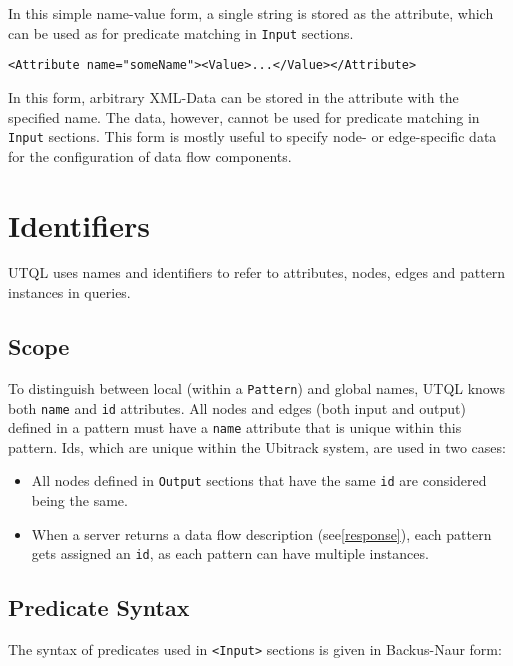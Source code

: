 \documentclass[11pt]{article}
\begin{document}
In this simple name-value form, a single string is stored as the attribute, which can be used as for predicate matching in \texttt{Input} sections.

\begin{Verbatim}[fontsize=\footnotesize,tabsize=2]
<Attribute name="someName"><Value>...</Value></Attribute>
\end{Verbatim}

In this form, arbitrary XML-Data can be stored in the attribute with the specified name. The data, however, cannot be used for predicate matching in \texttt{Input}  sections. This form is mostly useful to specify node- or edge-specific data for the configuration of data flow components.

\section{Identifiers}
\label{identifiers}

UTQL uses names and identifiers to refer to
attributes, nodes, edges and pattern instances in queries.

\subsection{Scope}
\label{scope}

To distinguish between local (within a \texttt{Pattern})
and global names, UTQL knows both \texttt{name} and 
\texttt{id} attributes. All nodes and edges (both input and output) defined in a pattern must have a 
\texttt{name} attribute that is unique within this pattern. Ids, which are unique within
the Ubitrack system, are used in two cases:

\begin{itemize}
 \item All nodes defined in \texttt{Output} sections that have the same \texttt{id} are considered being the same.
 \item When a server returns a data flow description (see\ref{response}), each pattern gets assigned an \texttt{id}, as
     each pattern can have multiple instances.
\end{itemize}

\subsection{Predicate Syntax}
\label{predicate}

The syntax of predicates used in \texttt{<Input>} sections is given in Backus-Naur form:
\end{document}
